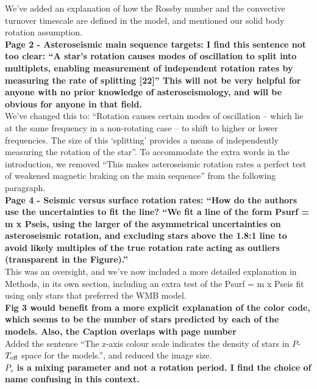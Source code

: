 \documentclass[11pt]{article}
\begin{document}
We’ve added an explanation of how the Rossby number and the convective turnover timescale are defined in the model, and mentioned our solid body rotation assumption.\\

\noindent\textbf{Page 2 - Asteroseismic main sequence targets: I find this sentence not too clear: “A star’s rotation causes modes of oscillation to split into multiplets, enabling measurement of independent rotation rates by measuring the rate of splitting [22]”
This will not be very helpful for anyone with no prior knowledge of asteroseismology, and will be obvious for anyone in that field.}\\

We’ve changed this to: “Rotation causes certain modes of oscillation -- which lie at the same frequency in a non-rotating case -- to shift to higher or lower frequencies. The size of this `splitting' provides a means of independently measuring the rotation of the star”.
To accommodate the extra words in the introduction, we removed “This makes asteroseismic rotation rates a perfect test of weakened magnetic braking on the main sequence” from the following paragraph.\\

\noindent\textbf{Page 4 - Seismic versus surface rotation rates: “How do the authors use the uncertainties to fit the line?
“We fit a line of the form Psurf = m x Pseis, using the larger of the asymmetrical uncertainties on asteroseismic rotation, and excluding stars above the 1.8:1 line to avoid likely multiples of the true rotation rate acting as outliers (transparent in the Figure).”}\\

This was an oversight, and we’ve now included a more detailed explanation in Methods, in its own section, including an extra test of the Psurf = m x Pseis fit using only stars that preferred the WMB model.\\

\noindent\textbf{Fig 3 would benefit from a more explicit explanation of the color code, which seems to be the number of stars predicted by each of the models. Also, the Caption overlaps with page number}\\
	
Added the sentence “The z-axis colour scale indicates the density of stars in $P$-$T_{\rm eff}$ space for the models.”, and reduced the image size.\\

\noindent\textbf{$P_s$ is a mixing parameter and not a rotation period. I find the choice of name confusing in this context.}\\
\end{document}
